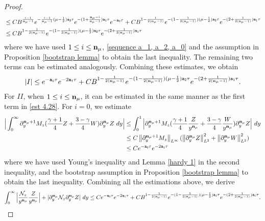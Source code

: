 \documentclass{article}
\newcommand{\norm}[1]{\left\lVert#1\right\rVert}
\newcommand{\ga}{\gamma}
\newcommand{\pa}{\partial}
\def\espz{Z}
\def\espw{W}
\def\mz{M_z}
\def\nz{\mathcal N_z}
\def\epone{\mathtt{a_1}}
\def\eptwo{\mathtt{a_2}}
\def\epzero{\mathtt{a_0}}
\def\ndmu{{\bf{n}_{\mu}}}
\numberwithin{equation}{section}
\begin{document}
\begin{proof}
\begin{align}
        &\leq  CB^{\frac{i-1}{\ndmu-1}} e^{-\frac{i-1}{\ndmu-1}(\mu-\frac12)\eptwo \tau} e^{-(1+\frac{\ndmu-i}{\ndmu-1})\epone \tau} e^{-\epzero \tau}+CB^{1-\frac{1}{2(\ndmu-1)}} e^{-(1-\frac{1}{2(\ndmu-1)})(\mu-\frac12)\eptwo \tau} e^{-(2+\frac{1}{2(\ndmu-1)})\epone \tau}\notag\\
        &\leq CB^{1-\frac{1}{2(\ndmu-1)}} e^{-(1-\frac{1}{2(\ndmu-1)})(\mu-\frac12)\eptwo \tau} e^{-(2+\frac{1}{2(\ndmu-1)})\epone \tau}\label{est 4.28}
        \end{align}
where we have used $1\leq i \leq \ndmu$, \eqref{sequence a_1, a_2, a_0} and the assumption in Proposition \ref{bootstrap lemma} to obtain the last inequality.
	The remaining two terms can be estimated analogously. Combining these estimates, we obtain
	\begin{align*}
		|I| \leq  e^{-\epzero\tau} e^{-2\epone\tau}+ CB^{1-\frac{1}{2(\ndmu-1)}} e^{-(1-\frac{1}{2(\ndmu-1)})(\mu-\frac12)\eptwo \tau} e^{-(2+\frac{1}{2(\ndmu-1)})\epone \tau}.
	\end{align*}
For $II$, when $1\leq i\leq \ndmu$, it can be estimated in the same manner as the first term in \eqref{est 4.28}. For $i=0$, we estimate
\begin{align*}
   \Big| \int_0^\infty\pa_y^{\ndmu+1}\mz (\frac{\ga+1}{4}\espz +\frac{3-\ga}{4}\espw)\pa_y^{\ndmu}\espz \ dy\Big|  
    &\leq \int_0^1 \Big|\pa_y^{\ndmu+1}\mz(\frac{\ga+1}{4}\frac{\espz}{y^{\ndmu}} +\frac{3-\ga}{4}\frac{\espw}{y^{\ndmu}})\pa_y^{\ndmu}\espz \Big| \ dy \\
    &\leq C \norm{\pa_y^{\ndmu+1}\mz}_{L^\infty}(\norm{\pa_y^{\ndmu}\espz}_{L^2}^2+\norm{\pa_y^{\ndmu}\espw}_{L^2}^2)\\
    &\leq C e^{-\epzero\tau} e^{-2\epone\tau}
\end{align*}
where we have used Young's inequality and Lemma \ref{hardy 1} in the second inequality, and the bootstrap assumption in Proposition \ref{bootstrap lemma} to obtain the last inequality. Combining all the estimations above, we derive
\[
     \int_0^\infty \Big| \frac{\nz}{y^{\ndmu}} \frac{\espz}{y^{\ndmu}}\Big| +| \pa_y^{\ndmu}\nz \pa_y^{\ndmu} \espz| \ dy  \leq C   e^{-\epzero\tau} e^{-2\epone\tau}  + CB^{1-\frac{1}{2(\ndmu-1)}} e^{-(1-\frac{1}{2(\ndmu-1)})(\mu-\frac12)\eptwo \tau} e^{-(2+\frac{1}{2(\ndmu-1)})\epone \tau}.
\]
 

\end{proof}
\end{document}
